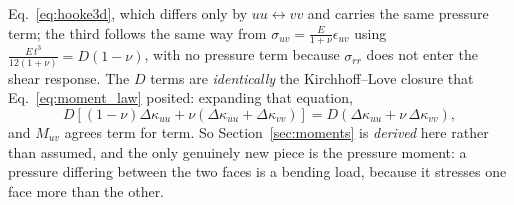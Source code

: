 \documentclass[11pt]{article}
\begin{document}
Eq.~\eqref{eq:hooke3d}, which differs only by $uu \leftrightarrow vv$ and carries
the same pressure term; the third follows the same way from
$\sigma_{uv} = \frac{E}{1+\nu}\epsilon_{uv}$ using
$\frac{E\,t^{3}}{12\left(1+\nu\right)} = D\left(1-\nu\right)$, with no pressure
term because $\sigma_{rr}$ does not enter the shear response. The $D$ terms are
\emph{identically} the Kirchhoff--Love closure that Eq.~\eqref{eq:moment_law}
posited: expanding that equation,
\begin{equation}\label{eq:KL_check}
    D\left[\left(1-\nu\right)\Delta\kappa_{uu}
      + \nu\left(\Delta\kappa_{uu}+\Delta\kappa_{vv}\right)\right]
    = D\left(\Delta\kappa_{uu} + \nu\,\Delta\kappa_{vv}\right),
\end{equation}
and $M_{uv}$ agrees term for term. So Section~\ref{sec:moments} is
\emph{derived} here rather than assumed, and the only genuinely new piece is the
pressure moment: a pressure differing between the two faces is a bending load,
because it stresses one face more than the other.
\end{document}
